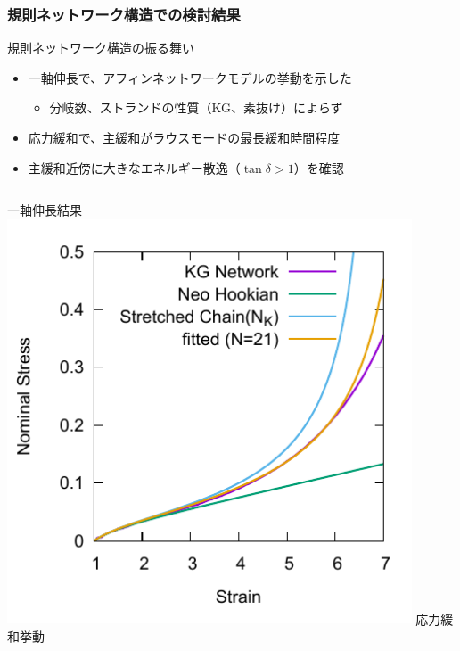 \documentclass[12pt, dvipdfmx]{beamer}
\begin{document}
\begin{frame}
	\frametitle{規則ネットワーク構造での検討結果}
		\small
		\begin{alertblock}{規則ネットワーク構造の振る舞い}
			\begin{itemize}
				\item 一軸伸長で、\alert{アフィンネットワークモデルの挙動}を示した
					\begin{itemize}
						\item \alert{分岐数、ストランドの性質（KG、素抜け）}によらず
					\end{itemize}
				\item 応力緩和で、主緩和が\alert{ラウスモードの最長緩和時間}程度
				\item 主緩和近傍に\alert{大きなエネルギー散逸（$\tan \delta > 1$）}を確認
			\end{itemize}
		\end{alertblock}
		\begin{columns}[totalwidth=1\textwidth]
				\scriptsize
				一軸伸長結果
				\includegraphics[width=0.9\textwidth]{SS_Kuhn.pdf}
				\scriptsize
				応力緩和挙動

\end{columns}
\end{frame}
\end{document}
